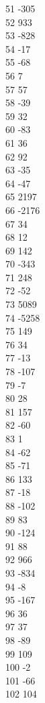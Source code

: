 { 51	-305 \\
 52	933 \\
 53	-828 \\
 54	-17 \\
 55	-68 \\
 56	7 \\
 57	57 \\
 58	-39 \\
 59	32 \\
 60	-83 \\
 61	36 \\
 62	92 \\
 63	-35 \\
 64	-47 \\
 65	2197 \\
 66	-2176 \\
 67	34 \\
 68	12 \\
 69	142 \\
 70	-343 \\
 71	248 \\
 72	-52 \\
 73	5089 \\
 74	-5258 \\
 75	149 \\
 76	34 \\
 77	-13 \\
 78	-107 \\
 79	-7 \\
 80	28 \\
 81	157 \\
 82	-60 \\
 83	1 \\
 84	-62 \\
 85	-71 \\
 86	133 \\
 87	-18 \\
 88	-102 \\
 89	83 \\
 90	-124 \\
 91	88 \\
 92	966 \\
 93	-834 \\
 94	-8 \\
 95	-167 \\
 96	36 \\
 97	37 \\
 98	-89 \\
 99	109 \\
 100	-2 \\
 101	-66 \\
 102	104 \\
}
